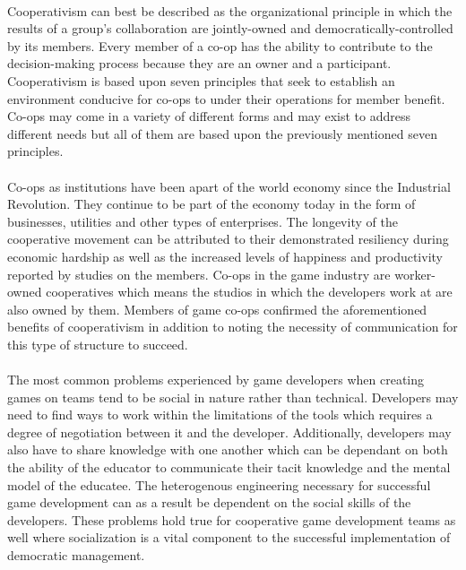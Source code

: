 \paragraph{} Cooperativism can best be described as the organizational principle in which the results of a group's collaboration are jointly-owned and democratically-controlled by its members. Every member of a co-op has the ability to contribute to the decision-making process because they are an owner and a participant. Cooperativism is based upon seven principles that seek to establish an environment conducive for co-ops to under their operations for member benefit. Co-ops may come in a variety of different forms and may exist to address different needs but all of them are based upon the previously mentioned seven principles.

\paragraph{} Co-ops as institutions have been apart of the world economy since the Industrial Revolution. They continue to be part of the economy today in the form of businesses, utilities and other types of enterprises. The longevity of the cooperative movement can be attributed to their demonstrated resiliency during economic hardship as well as the increased levels of happiness and productivity reported by studies on the members. Co-ops in the game industry are worker-owned cooperatives which means the studios in which the developers work at are also owned by them. Members of game co-ops confirmed the aforementioned benefits of cooperativism in addition to noting the necessity of communication for this type of structure to succeed.

\paragraph{} The most common problems experienced by game developers when creating games on teams tend to be social in nature rather than technical. Developers may need to find ways to work within the limitations of the tools which requires a degree of negotiation between it and the developer. Additionally, developers may also have to share knowledge with one another which can be dependant on both the ability of the educator to communicate their tacit knowledge and the mental model of the educatee. The heterogenous engineering necessary for successful game development can as a result be dependent on the social skills of the developers. These problems hold true for cooperative game development teams as well where socialization is a vital component to the successful implementation of democratic management.


